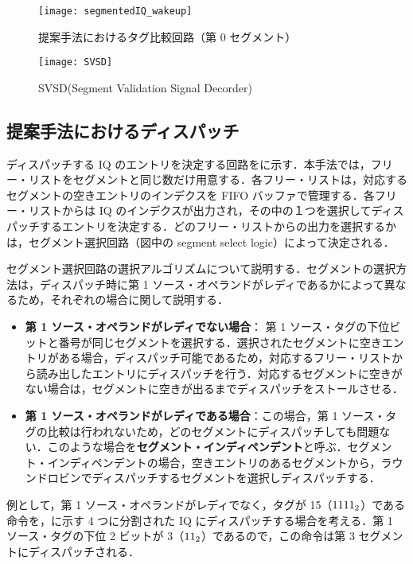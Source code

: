\begin{figure}[htb]
  \centering
  \texttt{[image: segmentedIQ\_wakeup]}
  \caption{提案手法におけるタグ比較回路（第 0 セグメント）}
  \label{fig:segmentedIQ_wakeup}
\end{figure}

\begin{figure}[htb]
  \centering
  \texttt{[image: SVSD]}
  \caption{SVSD(Segment Validation Signal Decorder)}
  \label{fig:SVSD}
\end{figure}

\subsection{提案手法におけるディスパッチ}
ディスパッチする IQ のエントリを決定する回路をに示す．本手法では，フリー・リストをセグメントと同じ数だけ用意する．各フリー・リストは，対応するセグメントの空きエントリのインデクスを FIFO バッファで管理する．各フリー・リストからは IQ のインデクスが出力され，その中の１つを選択してディスパッチするエントリを決定する．どのフリー・リストからの出力を選択するかは，セグメント選択回路（図中の segment select logic）によって決定される．

セグメント選択回路の選択アルゴリズムについて説明する．セグメントの選択方法は，ディスパッチ時に第 1 ソース・オペランドがレディであるかによって異なるため，それぞれの場合に関して説明する．
\begin{itemize}
  \item \textbf{第 1 ソース・オペランドがレディでない場合}： 第 1 ソース・タグの下位ビットと番号が同じセグメントを選択する．選択されたセグメントに空きエントリがある場合，ディスパッチ可能であるため，対応するフリー・リストから読み出したエントリにディスパッチを行う．対応するセグメントに空きがない場合は，セグメントに空きが出るまでディスパッチをストールさせる．
  \item \textbf{第 1 ソース・オペランドがレディである場合}：この場合，第 1 ソース・タグの比較は行われないため，どのセグメントにディスパッチしても問題ない．このような場合を\textbf{セグメント・インディペンデント}と呼ぶ．セグメント・インディペンデントの場合，空きエントリのあるセグメントから，ラウンドロビンでディスパッチするセグメントを選択しディスパッチする．
\end{itemize}
例として，第 1 ソース・オペランドがレディでなく，タグが 15（${\rm 1111_2}$）である命令を，に示す 4 つに分割された IQ にディスパッチする場合を考える．第 1 ソース・タグの下位 2 ビットが 3（${\rm 11_2}$）であるので，この命令は第 3 セグメントにディスパッチされる．　


